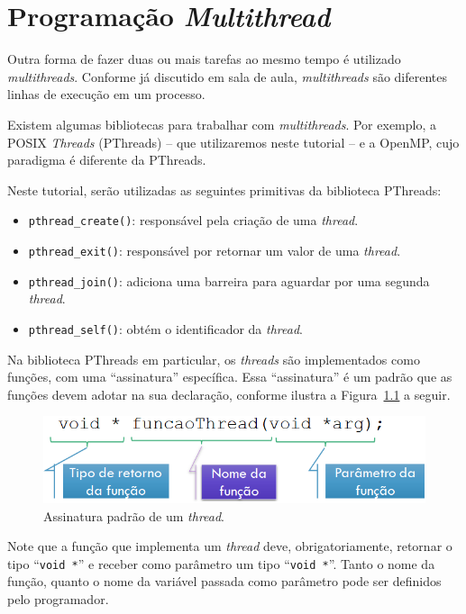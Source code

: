 \chapter{Programação \textit{Multithread}}
Outra forma de fazer duas ou mais tarefas ao mesmo tempo é utilizado \textit{multithreads}. Conforme já discutido em sala de aula, \textit{multithreads} são diferentes linhas de execução em um processo.

Existem algumas bibliotecas para trabalhar com \textit{multithreads}. Por exemplo, a POSIX \textit{Threads} (PThreads) -- que utilizaremos neste tutorial -- e a OpenMP, cujo paradigma é diferente da PThreads.

Neste tutorial, serão utilizadas as seguintes primitivas  da biblioteca PThreads:

\begin{itemize}
\setlength{\itemsep}{1pt}\setlength{\parskip}{0pt}  \setlength{\parsep}{0pt}
\item \texttt{pthread\_create()}: responsável pela criação de uma \textit{thread}.
\item \texttt{pthread\_exit()}: responsável por retornar um valor de uma \textit{thread}.
\item \texttt{pthread\_join()}: adiciona uma barreira para aguardar por uma segunda \textit{thread}.
\item \texttt{pthread\_self()}: obtém o identificador da \textit{thread}.
\end{itemize}

Na biblioteca PThreads em particular, os \textit{threads} são implementados como funções, com uma \enquote{assinatura} específica. Essa \enquote{assinatura} é um padrão que as funções devem adotar na sua declaração, conforme ilustra a Figura~\ref{fig:assinaturaThread} a seguir. 

\begin{figure}[!htb]
    \centering
    \includegraphics[width=.8\textwidth]{AssinaturaThread.png}
    \caption{Assinatura padrão de um \textit{thread}.}
    \label{fig:assinaturaThread}
\end{figure}

Note que a função que implementa um \textit{thread} deve, obrigatoriamente, retornar o tipo \enquote{\mbox{\texttt{void *}}} e receber como parâmetro um tipo \enquote{\mbox{\texttt{void *}}}. Tanto o nome da função, quanto o nome da variável passada como parâmetro pode ser definidos pelo programador.

